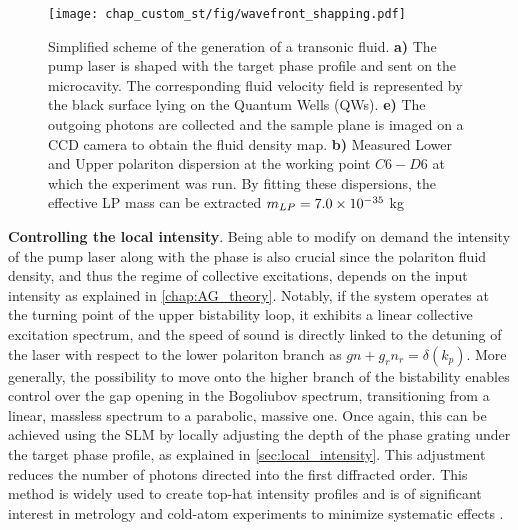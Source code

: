 \begin{figure}[t!]
    \centering
    \texttt{[image: chap\_custom\_st/fig/wavefront\_shapping.pdf]}
    \caption{Simplified scheme of the generation of a transonic fluid. \textbf{a)} The pump laser is shaped with the target phase profile and sent on the microcavity. The corresponding fluid velocity field is represented by the black surface lying on the Quantum Wells (QWs). \textbf{e)} The outgoing photons are collected and the sample 
    plane is imaged on a CCD camera to obtain the fluid density map.  \textbf{b)} Measured Lower and Upper polariton dispersion at the working point $C6-D6$ at which the experiment was run. By fitting these dispersions,
    the effective LP mass can be extracted $m_{LP}= 7.0 \times 10^{-35}$ kg}
    \label{fig:wavefront_shapping}
\end{figure}


\bigskip 

\textbf{Controlling the local intensity}. Being able to modify on demand the intensity of the pump laser along with the phase is also crucial since the polariton fluid density, and thus the regime of collective excitations, depends on the input intensity as explained in \autoref{chap:AG_theory}. 
Notably, if the system operates at the turning point of the upper bistability loop, it exhibits a linear collective excitation spectrum, and the speed of sound is directly linked to the detuning of the laser with respect to the lower polariton branch as $gn+g_rn_r=\delta(k_p)$. 
More generally, the possibility to move onto the higher branch of the bistability enables control over the gap opening in the Bogoliubov spectrum, transitioning from a linear, massless spectrum to a parabolic, massive one.  
Once again, this can be achieved using the SLM by locally adjusting the depth of the phase grating under the target phase profile, as explained in \autoref{sec:local_intensity}. This adjustment reduces the number of photons directed into the first diffracted order. This method is widely used to create top-hat intensity profiles and is of significant interest in metrology and cold-atom experiments to minimize systematic effects \cite{top_metrology_2018}.  

\bigskip

